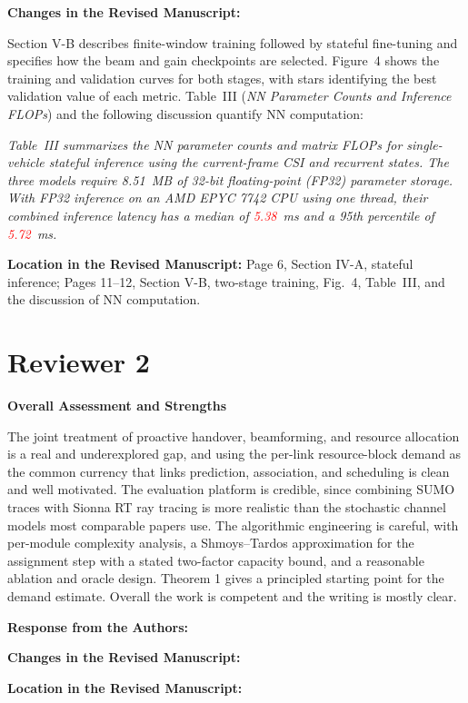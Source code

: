 \documentclass[11pt]{article}
\newenvironment{reviewedit}[1]
{\colorlet{responseblue}{#1}\colorlet{changeblue}{#1}\color{#1}}
{}
\newcounter{reviewcomment}[section]
\newenvironment{quotedcomment}
{%
  \begin{list}{}{
    \setlength{\leftmargin}{1.5em}%
    \setlength{\rightmargin}{0.5em}%
    \setlength{\topsep}{0.25em}%
    \setlength{\parsep}{0.35em}%
  }
  \item\relax\color{commentgray}\itshape
}
{\end{list}}
\newcommand{\generalheading}[1]{%
  \par\medskip\noindent\textbf{#1}
}
\newenvironment{authorresponse}
{\par\noindent\textcolor{responseblue}{\textbf{Response from the Authors:}}\par\color{responseblue}}
{\par}
\newenvironment{manuscriptchanges}
{\par\noindent\textcolor{changeblue}{\textbf{Changes in the Revised Manuscript:}}\par\color{changeblue}}
{\par}
\newcommand{\revisionlocation}[1]{%
  \par\noindent\textbf{Location in the Revised Manuscript:} #1\par
}
\newcommand{\blankreply}{%
  \begin{authorresponse}
  \vspace{1.2\baselineskip}
  \end{authorresponse}
  \begin{manuscriptchanges}
  \vspace{1.2\baselineskip}
  \end{manuscriptchanges}
  \revisionlocation{}
}
\begin{document}
\begin{reviewedit}{blue}
\begin{manuscriptchanges}
Section V-B describes finite-window training followed by stateful fine-tuning
and specifies how the beam and gain checkpoints are selected. Figure~4 shows
the training and validation curves for both stages, with stars identifying
the best validation value of each metric. Table~III (\emph{NN Parameter Counts
and Inference FLOPs}) and the following discussion quantify NN computation:

\emph{Table~III summarizes the NN parameter counts and matrix FLOPs for single-vehicle stateful inference using the current-frame CSI and recurrent states. The three models require 8.51~MB of 32-bit floating-point (FP32) parameter storage. With FP32 inference on an AMD EPYC 7742 CPU using one thread, their combined inference latency has a median of \textcolor{red}{5.38}~ms and a 95th percentile of \textcolor{red}{5.72}~ms.}
\end{manuscriptchanges}
\revisionlocation{Page 6, Section IV-A, stateful inference;
Pages 11--12, Section V-B, two-stage training, Fig.~4, Table~III, and the
discussion of NN computation.}

\end{reviewedit}

\clearpage
\section{Reviewer 2}

\setcounter{reviewcomment}{0}
\generalheading{Overall Assessment and Strengths}
\begin{quotedcomment}
The joint treatment of proactive handover, beamforming, and resource allocation is a real and
underexplored gap, and using the per-link resource-block demand as the common currency that
links prediction, association, and scheduling is clean and well motivated. The evaluation
platform is credible, since combining SUMO traces with Sionna RT ray tracing is more realistic
than the stochastic channel models most comparable papers use. The algorithmic engineering is
careful, with per-module complexity analysis, a Shmoys--Tardos approximation for the assignment
step with a stated two-factor capacity bound, and a reasonable ablation and oracle design.
Theorem 1 gives a principled starting point for the demand estimate. Overall the work is
competent and the writing is mostly clear.
\end{quotedcomment}
\blankreply
\end{document}
